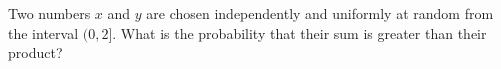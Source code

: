 Two numbers $x$ and $y$ are chosen independently and uniformly at random from the interval $(0,2]$. What is the probability that their sum is greater than their product?
